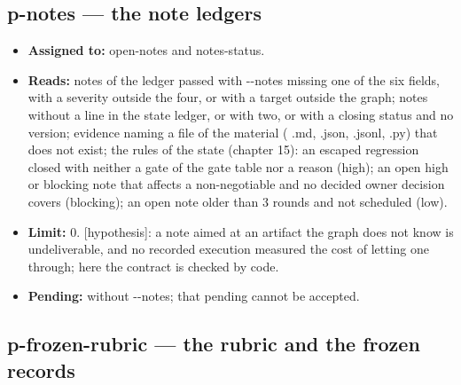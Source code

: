 \documentclass[
  american,
  10pt,
]{report}
\providecommand{\tightlist}{%
  \setlength{\itemsep}{0pt}\setlength{\parskip}{0pt}}
\renewcommand{\texttt}[1]{{\ttfamily\hyphenchar\font=-1 #1}}
\begin{document}
\subsection{\texorpdfstring{\texttt{p-\allowbreak{}notes} --- the note
ledgers}{ --- the note ledgers}}\label{p-notes-the-note-ledgers}

\begin{itemize}
\tightlist
\item
  \textbf{Assigned to:} \texttt{open-\allowbreak{}notes} and
  \texttt{notes-\allowbreak{}status}.
\item
  \textbf{Reads:} notes of the ledger passed with
  \texttt{-\allowbreak{}-\allowbreak{}notes} missing one of the six
  fields, with a severity outside the four, or with a target outside the
  graph; notes without a line in the state ledger, or with two, or with
  a closing status and no version; evidence naming a file of the
  material (\texttt{.\allowbreak{}md}, \texttt{.\allowbreak{}json},
  \texttt{.\allowbreak{}jsonl}, \texttt{.\allowbreak{}py}) that does not
  exist; the rules of the state (chapter 15): an escaped regression
  closed with neither a gate of the gate table nor a reason (high); an
  open high or blocking note that affects a non-negotiable and no
  decided owner decision covers (blocking); an open note older than 3
  rounds and not scheduled (low).
\item
  \textbf{Limit:} 0. \texttt{[hypothesis]}: a note aimed at an artifact
  the graph does not know is undeliverable, and no recorded execution
  measured the cost of letting one through; here the contract is checked
  by code.
\item
  \textbf{Pending:} without \texttt{-\allowbreak{}-\allowbreak{}notes};
  that pending cannot be accepted.
\end{itemize}

\subsection{\texorpdfstring{\texttt{p-\allowbreak{}frozen-\allowbreak{}rubric}
--- the rubric and the frozen
records}{ --- the rubric and the frozen records}}\label{p-frozen-rubric-the-rubric-and-the-frozen-records}
\end{document}
